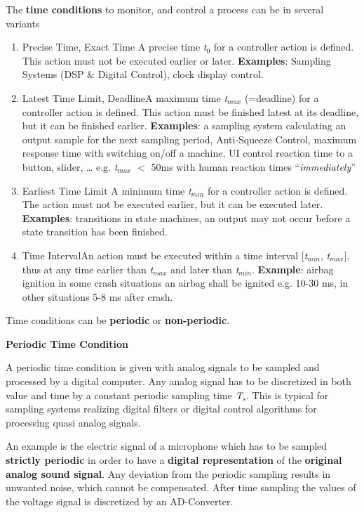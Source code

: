 The \textbf{time conditions} to monitor, and control a process can be in several variants

\begin{enumerate}
\item  Precise Time, Exact Time A precise time \textit{t}${}_{0}$ for a controller action is defined. This action must not be executed earlier or later. \textbf{Examples}: Sampling Systems (DSP \& Digital Control),      clock display control.

\item  Latest Time Limit, DeadlineA maximum time \textit{t}${}_{max}$ (=deadline) for a controller action is defined. This action must be finished latest at its deadline, but it can be finished earlier. \textbf{Examples}: a sampling system calculating an output sample for the next sampling      period, Anti-Squeeze Control, maximum response time with switching      on/off a machine, UI control reaction time to a button, slider, {\dots}      e.g. \textit{t${}_{max}$} $\mathrm{<}$ 50ms with human reaction times  ``\textit{immediately}''    

\item  Earliest Time Limit A minimum time \textit{t}${}_{min}$ for a controller action is defined. The action must not be executed earlier, but it can be executed later. \textbf{Examples}: transitions in state machines, an output may not occur before a state       transition has been finished.

\item  Time IntervalAn action must be executed within a time interval [\textit{t}${}_{min}$, \textit{t}${}_{max}$], thus at any time earlier than \textit{t}${}_{max}$ and later than\textit{ t}${}_{min}$. \textbf{Example}:  airbag ignition in some crash situations an airbag shall be ignited      e.g. 10-30 ms, in other situations 5-8 ms after crash.
\end{enumerate}

Time conditions can be \textbf{periodic} or \textbf{non-periodic}. 

\textbf{ Periodic Time Condition }

A periodic time condition is given with analog signals to be sampled and processed by a digital computer. Any analog signal has to be discretized in both value and time by a constant periodic sampling time \textit{T}${}_{s}$. This is typical for sampling systems realizing digital filters or digital control algorithms for processing quasi analog signals.

An example is the electric signal of a microphone which has to be sampled \textbf{strictly periodic} in order to have a \textbf{digital representation} of the \textbf{original analog sound signal}. Any deviation from the periodic sampling results in unwanted noise, which cannot be compensated. After time sampling the values of the voltage signal is discretized by an AD-Converter.

